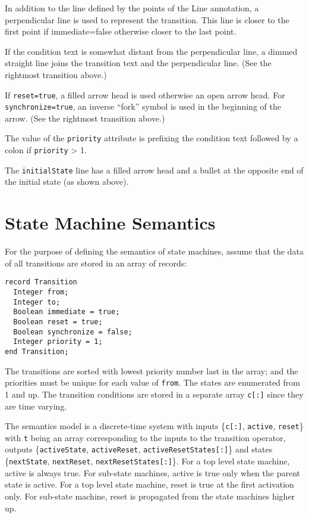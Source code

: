 In addition to the line defined by the points of the Line annotation, a
perpendicular line is used to represent the transition. This line is
closer to the first point if immediate=false otherwise closer to the
last point.

If the condition text is somewhat distant from the perpendicular line, a
dimmed straight line joins the transition text and the perpendicular
line.  (See the rightmost transition above.)

If \lstinline!reset=true!, a filled arrow head is used otherwise an open arrow head.
For \lstinline!synchronize=true!, an inverse ``fork'' symbol is used in the
beginning of the arrow.  (See the rightmost transition above.)

The value of the \lstinline!priority! attribute is prefixing the condition text
followed by a colon if \lstinline!priority! \textgreater{} 1.

The \lstinline!initialState! line has a filled arrow head and a bullet at the
opposite end of the initial state (as shown above).

\section{State Machine Semantics}\label{state-machine-semantics}

For the purpose of defining the semantics of state machines, assume that
the data of all transitions are stored in an array of records:
\begin{lstlisting}[language=modelica]
record Transition
  Integer from;
  Integer to;
  Boolean immediate = true;
  Boolean reset = true;
  Boolean synchronize = false;
  Integer priority = 1;
end Transition;
\end{lstlisting}

The transitions are sorted with lowest priority number last in the
array; and the priorities must be unique for each value of \lstinline!from!. The
states are enumerated from 1 and up. The transition conditions are
stored in a separate array \lstinline!c[:]! since they are time varying.

The semantics model is a discrete-time system with inputs \{\lstinline!c[:]!,
\lstinline!active!, \lstinline!reset!\} with \lstinline!t! being an array corresponding to the inputs to the
transition operator, outputs \{\lstinline!activeState!, \lstinline!activeReset!,
\lstinline!activeResetStates[:]!\} and states \{\lstinline!nextState!, \lstinline!nextReset!,
\lstinline!nextResetStates[:]!\}. For a top level state machine, active is
always true. For sub-state machines, active is true only when the parent
state is active. For a top level state machine, reset is true at the
first activation only. For sub-state machine, reset is propagated from
the state machines higher up.

